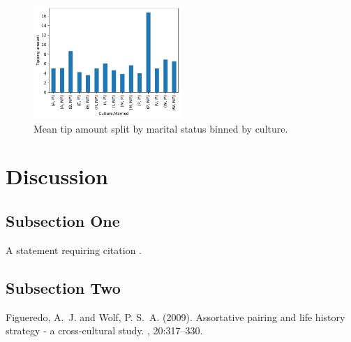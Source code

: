 \documentclass[twoside,twocolumn]{article}
\begin{document}
\begin{figure}[h]
  \centering
  \includegraphics[width=0.5\textwidth]{figures/culture_impact.pdf}
  \caption{Mean tip amount split by marital status binned by culture.}
  \label{fig:culture-impact}
\end{figure}


\section{Discussion}

\subsection{Subsection One}

A statement requiring citation \cite{Figueredo:2009dg}.
\blindtext %

\subsection{Subsection Two}

\blindtext %


\begin{thebibliography}{99} %

Figueredo, A.~J. and Wolf, P. S.~A. (2009).
\newblock Assortative pairing and life history strategy - a cross-cultural
  study.
, 20:317--330.

\end{thebibliography}

\end{document}
